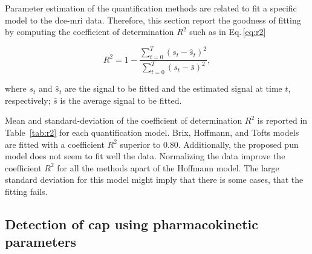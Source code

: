 Parameter estimation of the quantification methods are related to fit a specific model to the \ac{dce}-\ac{mri} data.
Therefore, this section report the goodness of fitting by computing the coefficient of determination $R^2$ such as in Eq.\,\eqref{eq:r2}

\begin{equation}
  R^2 = 1 - \frac{\sum_{t = 0}^{T} (s_t - \hat{s}_t)^2}{\sum_{t = 0}^{T} (s_t - \bar{s})^2} ,
  \label{eq:r2}
\end{equation}

\noindent where $s_t$ and $\hat{s}_t$ are the signal to be fitted and the estimated signal at time $t$, respectively; $\bar{s}$ is the average signal to be fitted.

Mean and standard-deviation of the coefficient of determination $R^{2}$ is reported in Table~\ref{tab:r2} for each quantification model.
Brix, Hoffmann, and Tofts models are fitted with a coefficient $R^{2}$ superior to 0.80.%
Additionally, the proposed \ac{pun} model does not seem to fit well the data.
Normalizing the data improve the coefficient $R^2$ for all the methods apart of the Hoffmann model.
The large standard deviation for this model might imply that there is some cases, that the fitting fails.

\subsection{Detection of \acs*{cap} using pharmacokinetic parameters}

